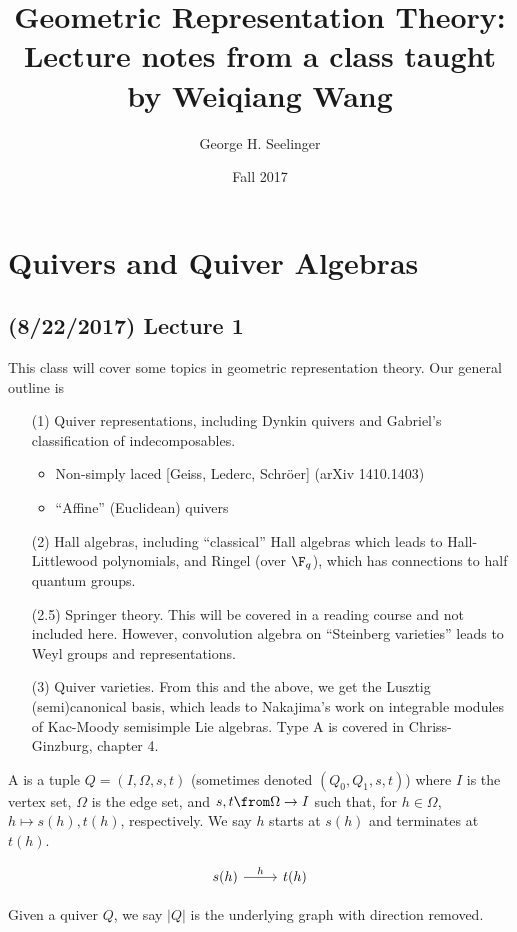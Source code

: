 \documentclass[11pt,leqno,oneside]{amsbook}
\title[Geometric Representation Theory]{Geometric Representation
  Theory: Lecture notes from a class taught by Weiqiang Wang}
\author{George H. Seelinger}
\date{Fall 2017}
\numberwithin{thm}{section}
\renewcommand{\Q}{Q} %
\begin{document}
\maketitle
\section{Quivers and Quiver Algebras}
\subsection*{(8/22/2017) Lecture 1}
This class will cover some topics in geometric representation
theory. Our general outline is
\begin{enumerate}
\item[(1)] Quiver representations, including Dynkin quivers and Gabriel's
  classification of indecomposables.
  \begin{itemize}
  \item Non-simply laced [Geiss, Lederc, Schr\"{o}er] (arXiv 1410.1403)
  \item ``Affine'' (Euclidean) quivers
  \end{itemize}
\item[(2)] Hall algebras, including ``classical'' Hall algebras which leads
  to Hall-Littlewood polynomials, and Ringel (over \(\F_q\)), which
  has connections to half quantum groups.
\item[(2.5)] Springer theory. This will be covered in a reading course
  and not included here. However, convolution algebra on ``Steinberg
  varieties'' leads to Weyl groups and representations.
\item[(3)] Quiver varieties. From this and the above, we get the
  Lusztig (semi)canonical basis, which leads to Nakajima's work on
  integrable modules of Kac-Moody semisimple Lie algebras. Type A is
  covered in Chriss-Ginzburg, chapter 4.
\end{enumerate}
\begin{defn}
  A  is a tuple \(\Q = (I,\Omega,s,t)\) (sometimes denoted
  \((\Q_0,\Q_1,s,t)\)) where \(I\) is the vertex set, \(\Omega\) is the
  edge set, and \(s,t \from \Omega \to I\) such that, for \(h \in
  \Omega\), \(h \mapsto s(h), t(h)\), respectively. We say \(h\)
  starts at \(s(h)\) and terminates at \(t(h)\). 
\end{defn}
\[
\begin{tikzcd}
s(h) \arrow[r,"h"] & t(h)
\end{tikzcd}
\]
\begin{defn}
  Given a quiver \(\Q\), we say \(\left| \Q \right|\) is the underlying
  graph with direction removed.
\end{defn}
\end{document}
